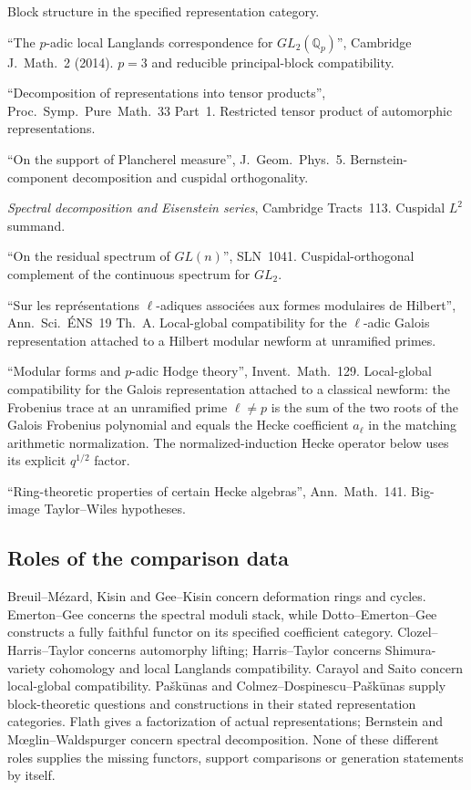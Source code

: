 \begin{description}
Block structure in the specified representation category.
\item[Colmez--Dospinescu--Pa{\v s}k{\=u}nas]
``The \(p\)-adic local Langlands correspondence for \(GL_{2}(\mathbb{Q}_{p})\)'',
Cambridge J.~Math.~2 (2014). \(p=3\) and reducible
principal-block compatibility.
\item[Flath 1979] ``Decomposition of representations into tensor
products'', Proc.~Symp.~Pure~Math.~33 Part~1. Restricted tensor
product of automorphic representations.
\item[Bernstein 1988] ``On the support of Plancherel measure'',
J.~Geom.~Phys.~5. Bernstein-component decomposition and
cuspidal orthogonality.
\item[Mo{\oe}glin--Waldspurger 1995] \emph{Spectral decomposition and
Eisenstein series}, Cambridge Tracts~113. Cuspidal \(L^{2}\) summand.
\item[Jacquet 1983] ``On the residual spectrum of \(GL(n)\)'',
SLN~1041. Cuspidal-orthogonal complement of the continuous spectrum
for \(GL_{2}\).
\item[Carayol 1986] ``Sur les repr{\'e}sentations \(\ell\)-adiques
associ{\'e}es aux formes modulaires de Hilbert'', Ann.~Sci.~\'ENS~19
Th.~A. Local-global compatibility for the \(\ell\)-adic Galois
representation attached to a Hilbert modular newform at unramified
primes.
\item[Saito 1997] ``Modular forms and \(p\)-adic Hodge theory'',
Invent.~Math.~129. Local-global compatibility for the Galois
representation attached to a classical newform: the Frobenius
trace at an unramified prime \(\ell \neq p\) is the sum of the
two roots of the Galois Frobenius polynomial and equals the Hecke
coefficient \(a_{\ell}\) in the matching arithmetic normalization.
The normalized-induction Hecke operator below uses its explicit
\(q^{1/2}\) factor.
\item[Taylor--Wiles 1995] ``Ring-theoretic properties of certain
Hecke algebras'', Ann.~Math.~141. Big-image Taylor--Wiles
hypotheses.
\end{description}

\subsection{Roles of the comparison data}
Breuil--M\'{e}zard, Kisin and Gee--Kisin concern deformation rings and
cycles. Emerton--Gee concerns the spectral moduli stack, while
Dotto--Emerton--Gee constructs a fully faithful functor on its specified
coefficient category. Clozel--Harris--Taylor concerns automorphy lifting;
Harris--Taylor concerns Shimura-variety cohomology and local Langlands
compatibility. Carayol and Saito concern local-global compatibility. Pa\v{s}k\=unas and Colmez--Dospinescu--Pa\v{s}k\=unas
supply block-theoretic questions and constructions in their stated
representation categories. Flath gives a factorization of actual
representations; Bernstein and M\oe glin--Waldspurger concern spectral
decomposition. None of these different roles supplies the missing
functors, support comparisons or generation statements by itself.
